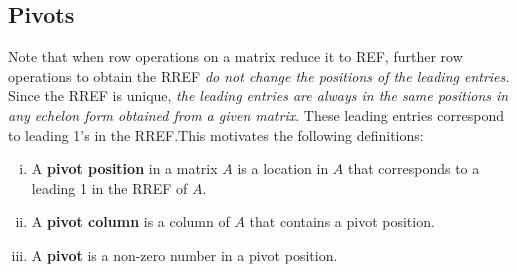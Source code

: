 \documentclass[12pt,letterpaper,reqno]{article}
\numberwithin{equation}{section}
\newcommand{\ti}[1]{\textit{#1}}
\begin{document}
\subsection{Pivots}
Note that when row operations on a matrix reduce it to REF, further row operations to obtain the RREF \ti{do not change the positions of the leading entries.} Since the RREF is unique, \ti{the leading entries are always in the same positions in any echelon form obtained from a given matrix}. These leading entries correspond to leading 1's in the RREF.This motivates the following definitions:

\begin{defn} \label{def:pivots_pivot_positions_pivot_columns} \hspace{10cm}
	\begin{enumerate}[(i)]
	\item A {\bf pivot position} in a matrix $A$ is a location in $A$ that corresponds to a leading 1 in the RREF of $A$. 
	\item A {\bf pivot column} is a column of $A$ that contains a pivot position.
	\item A {\bf pivot} is a non-zero number in a pivot position.
\end{enumerate}
\end{defn}
\end{document}

